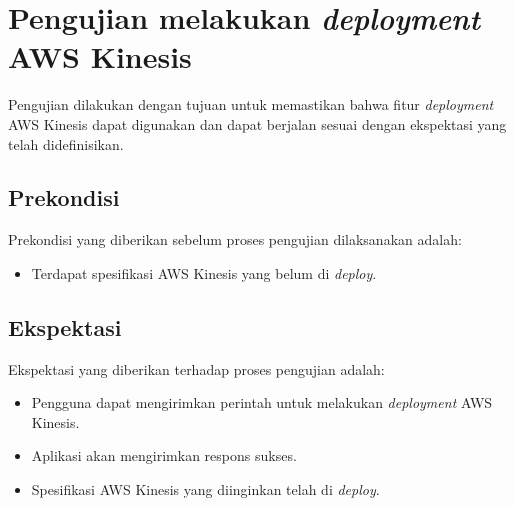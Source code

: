 \section{Pengujian melakukan \textit{deployment} AWS Kinesis}
Pengujian dilakukan dengan tujuan untuk memastikan bahwa fitur \textit{deployment} AWS Kinesis dapat digunakan dan dapat berjalan sesuai dengan ekspektasi yang telah didefinisikan.
\subsection{Prekondisi}
Prekondisi yang diberikan sebelum proses pengujian dilaksanakan adalah:
\begin{itemize}
    \item Terdapat spesifikasi AWS Kinesis yang belum di \textit{deploy}.
\end{itemize}
\subsection{Ekspektasi}
Ekspektasi yang diberikan terhadap proses pengujian adalah:
\begin{itemize}
    \item Pengguna dapat mengirimkan perintah untuk melakukan \textit{deployment} AWS Kinesis.
    \item Aplikasi akan mengirimkan respons sukses.
    \item Spesifikasi AWS Kinesis yang diinginkan telah di \textit{deploy}.
\end{itemize}
